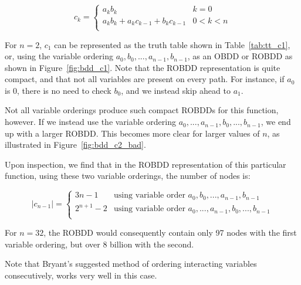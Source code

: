 \documentclass[a4paper,11pt]{kth-mag}
\newcommand{\AND}{}
\newcommand{\IOR}{+}
\begin{document}
$$
  c_k = \left\{
  \begin{array}{ll}
    a_k \AND b_k                                             & k = 0 \\
    a_k \AND b_k \IOR a_k \AND c_{k-1} \IOR b_k \AND c_{k-1} & 0 < k < n \\
  \end{array}\right.
$$

For $n = 2$, $c_1$ can be represented as the truth table shown in Table~\ref{tab:tt_c1}, or, using the variable ordering $a_0,b_0,...,a_{n-1},b_{n-1}$, as an OBDD or ROBDD as shown in Figure~\ref{fig:bdd_c1}.
Note that the ROBDD representation is quite compact, and that not all variables are present on every path.
For instance, if $a_0$ is 0, there is no need to check $b_0$, and we instead skip ahead to $a_1$.

Not all variable orderings produce such compact ROBDDs for this function, however.
If we instead use the variable ordering $a_0,...,a_{n-1},b_0,...,b_{n-1}$, we end up with a larger ROBDD.
This becomes more clear for larger values of $n$, as illustrated in Figure~\ref{fig:bdd_c2_bad}.

Upon inspection, we find that in the ROBDD representation of this particular function, using these two variable orderings, the number of nodes is:

$$
  |c_{n-1}| = \left\{
  \begin{array}{ll}
    3n-1      & \textrm{using variable order $a_0,b_0,...,a_{n-1},b_{n-1}$} \\
    2^{n+1}-2 & \textrm{using variable order $a_0,...,a_{n-1},b_0,...,b_{n-1}$} \\
  \end{array}\right.
$$

For $n = 32$, the ROBDD would consequently contain only 97 nodes with the first variable ordering, but over 8 billion with the second.

Note that Bryant's suggested method of ordering interacting variables consecutively, works very well in this case.
\end{document}
